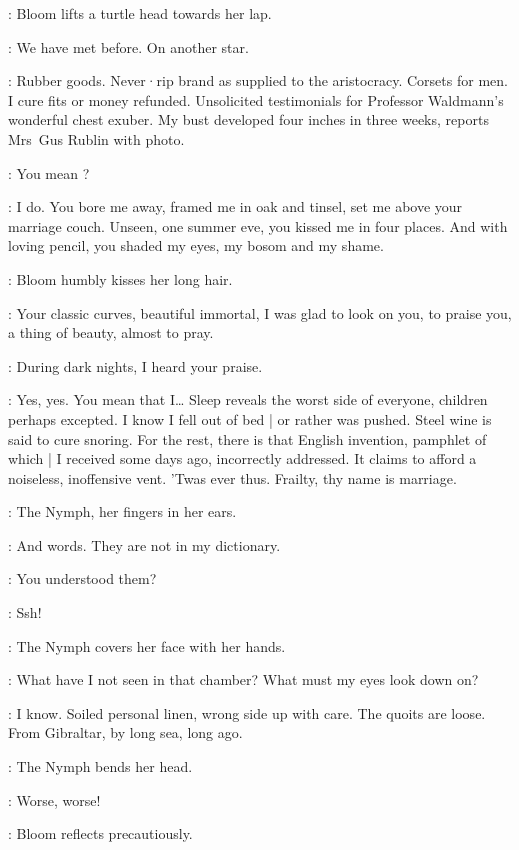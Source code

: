 :
Bloom lifts a turtle head towards her lap.

\Bloom:
We have met before.
On another star.

\Nymph:
Rubber goods.
Never·rip brand as supplied to the aristocracy.
Corsets for men.
I cure fits or money refunded.
Unsolicited testimonials for Professor Waldmann's wonderful chest exuber.
My bust developed four inches in three weeks,
reports Mrs~Gus Rublin with photo.

\Bloom:
You mean ?

\Nymph:
I do.
You bore me away,
framed me in oak and tinsel,
set me above your marriage couch.
Unseen,
one summer eve,
you kissed me in four places.
And with loving pencil,
you shaded my eyes,
my bosom and my shame.

:
Bloom humbly kisses her long hair.

\Bloom:
Your classic curves,
beautiful immortal,
I was glad to look on you,
to praise you,
a thing of beauty,
almost to pray.

\Nymph:
During dark nights,
I heard your praise.%

\Bloom:
Yes,
yes.
You mean that I…
Sleep reveals the worst side of everyone,
children perhaps excepted.
I know I fell out of bed |
or rather was pushed.
Steel wine is said to cure snoring.
For the rest,
there is that English invention,
pamphlet of which |
I received some days ago,
incorrectly addressed.
It claims to afford a noiseless,
inoffensive vent.
'Twas ever thus.
Frailty,
thy name is marriage.

:
The Nymph,
her fingers in her ears.

\Nymph:
And words.
They are not in my dictionary.

\Bloom:
You understood them?

\Yews[2]:
Ssh!

:
The Nymph covers her face with her hands.

\Nymph:
What have I not seen in that chamber?
What must my eyes look down on?

\Bloom:
I know.
Soiled personal linen,
wrong side up with care.
The quoits are loose.
From Gibraltar,
by long sea,
long ago.

:
The Nymph bends her head.

\Nymph:
Worse,
worse!

:
Bloom reflects precautiously.

